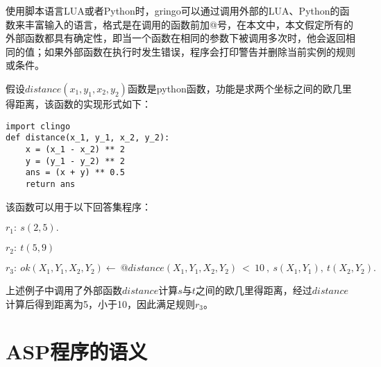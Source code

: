 \begin{definition}[外部函数]使用脚本语言LUA或者Python时，gringo可以通过调用外部的LUA、Python的函数来丰富输入的语言，格式是在调用的函数前加@号，在本文中，本文假定所有的外部函数都具有确定性，即当一个函数在相同的参数下被调用多次时，他会返回相同的值；如果外部函数在执行时发生错误，程序会打印警告并删除当前实例的规则或条件。
\begin{example}
假设$distance(x_1,y_1,x_2,y_2)$函数是python函数，功能是求两个坐标之间的欧几里得距离，该函数的实现形式如下：

\begin{tcolorbox}
\setmonofont{Source Code Pro} %
\begin{verbatim}
import clingo
def distance(x_1, y_1, x_2, y_2):
    x = (x_1 - x_2) ** 2
    y = (y_1 - y_2) ** 2
    ans = (x + y) ** 0.5
    return ans
\end{verbatim}
\end{tcolorbox}

该函数可以用于以下回答集程序：

$ r_1: \ s(2,5).$

$ r_2: \ t(5,9)$

$ r_3: \ ok(X_1,Y_1,X_2,Y_2) \leftarrow \  @distance(X_1,Y_1,X_2,Y_2)\ < \ 10\ , \ s(X_1,Y_1), \ t(X_2,Y_2).$

上述例子中调用了外部函数$distance$计算$s$与$t$之间的欧几里得距离，经过$distance$计算后得到距离为5，小于10，因此满足规则$r_3$。
\end{example}
\end{definition}
\section{ASP程序的语义}
